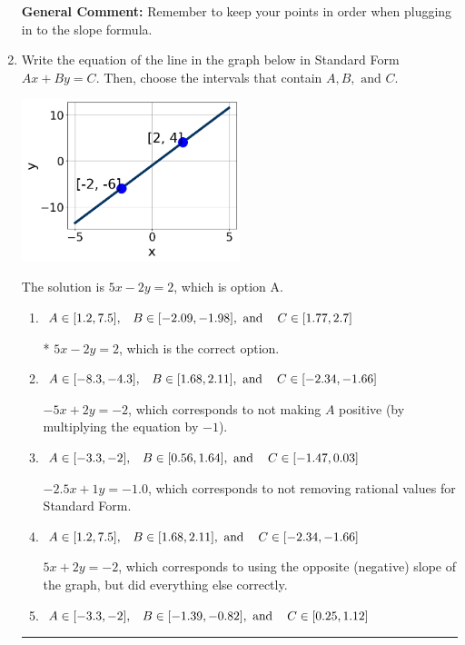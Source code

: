 \documentclass{extbook}[14pt]
\newcommand{\litem}[1]{\item #1

\rule{\textwidth}{0.4pt}}
\begin{document}
\begin{enumerate}
{\textbf{General Comment:} Remember to keep your points in order when plugging in to the slope formula.
}
\litem{
Write the equation of the line in the graph below in Standard Form $Ax+By=C$. Then, choose the intervals that contain $A, B, \text{ and } C$.

\begin{center}
    \includegraphics[width=0.5\textwidth]{../Figures/linearGraphToStandardB.png}
\end{center}


The solution is \( 5x - 2y = 2 \), which is option A.\begin{enumerate}[label=\Alph*.]
\item \( A \in [1.2, 7.5], \hspace{3mm} B \in [-2.09, -1.98], \text{ and } \hspace{3mm} C \in [1.77, 2.7] \)

* $5x - 2y = 2$, which is the correct option.
\item \( A \in [-8.3, -4.3], \hspace{3mm} B \in [1.68, 2.11], \text{ and } \hspace{3mm} C \in [-2.34, -1.66] \)

 $-5x + 2y = -2$, which corresponds to not making $A$ positive (by multiplying the equation by $-1$).
\item \( A \in [-3.3, -2], \hspace{3mm} B \in [0.56, 1.64], \text{ and } \hspace{3mm} C \in [-1.47, 0.03] \)

 $-2.5x + 1y = -1.0$, which corresponds to not removing rational values for Standard Form.
\item \( A \in [1.2, 7.5], \hspace{3mm} B \in [1.68, 2.11], \text{ and } \hspace{3mm} C \in [-2.34, -1.66] \)

 $5x + 2y = -2$, which corresponds to using the opposite (negative) slope of the graph, but did everything else correctly.
\item \( A \in [-3.3, -2], \hspace{3mm} B \in [-1.39, -0.82], \text{ and } \hspace{3mm} C \in [0.25, 1.12] \)


\end{enumerate}}
\end{enumerate}
\end{document}
